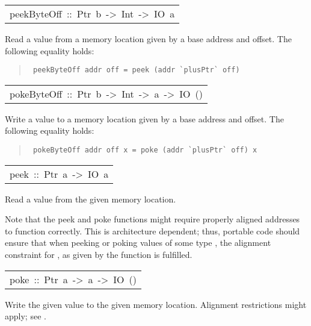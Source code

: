 \begin{haddockdesc}
\begin{haddockdesc}
\end{haddockdesc}
\begin{haddockdesc}
\item[\begin{tabular}{@{}l}
peekByteOff\ ::\ Ptr\ b\ ->\ Int\ ->\ IO\ a
\end{tabular}]\haddockbegindoc
Read a value from a memory location given by a base
         address and offset.  The following equality holds:
\par
\begin{quote}
{\haddockverb\begin{verbatim}
 peekByteOff addr off = peek (addr `plusPtr` off)
\end{verbatim}}
\end{quote}

\end{haddockdesc}
\begin{haddockdesc}
\item[\begin{tabular}{@{}l}
pokeByteOff\ ::\ Ptr\ b\ ->\ Int\ ->\ a\ ->\ IO\ ()
\end{tabular}]\haddockbegindoc
Write a value to a memory location given by a base
         address and offset.  The following equality holds:
\par
\begin{quote}
{\haddockverb\begin{verbatim}
 pokeByteOff addr off x = poke (addr `plusPtr` off) x
\end{verbatim}}
\end{quote}

\end{haddockdesc}
\begin{haddockdesc}
\item[\begin{tabular}{@{}l}
peek\ ::\ Ptr\ a\ ->\ IO\ a
\end{tabular}]\haddockbegindoc
Read a value from the given memory location.
\par
Note that the peek and poke functions might require properly
  aligned addresses to function correctly.  This is architecture
  dependent; thus, portable code should ensure that when peeking or
  poking values of some type , the alignment
  constraint for , as given by the function
   is fulfilled.
\par

\end{haddockdesc}
\begin{haddockdesc}
\item[\begin{tabular}{@{}l}
poke\ ::\ Ptr\ a\ ->\ a\ ->\ IO\ ()
\end{tabular}]\haddockbegindoc
Write the given value to the given memory location.  Alignment
 restrictions might apply; see .
\par

\end{haddockdesc}
\end{haddockdesc}
